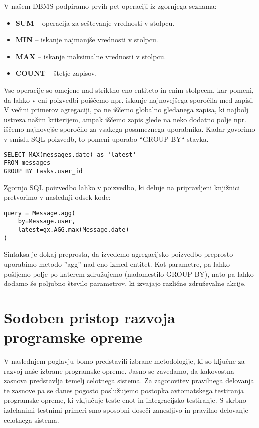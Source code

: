 \documentclass[a4paper,12pt,openright]{book}
\begin{document}
\begin{itemize}
        V našem DBMS podpiramo prvih pet operaciji iz zgornjega seznama:
        \begin{itemize}
            \item \textbf{SUM} – operacija za seštevanje vrednosti v stolpcu.
            \item \textbf{MIN} – iskanje najmanjše vrednosti v stolpcu.
            \item \textbf{MAX} – iskanje maksimalne vrednosti v stolpcu.
            \item \textbf{COUNT} – štetje zapisov.
        \end{itemize}

        Vse operacije so omejene nad striktno eno entiteto in enim stolpcem, kar pomeni, da lahko v eni poizvedbi poiščemo npr. iskanje najnovejšega sporočila med zapisi. V večini primerov agregaciji, pa ne iščemo globalno gledanega zapisa, ki najbolj ustreza našim kriterijem, ampak iščemo zapis glede na neko dodatno polje npr. iščemo najnovejše sporočilo za vsakega posameznega uporabnika. Kadar govorimo v smislu SQL poizvedb, to pomeni uporabo ``GROUP BY`` stavka.

\begin{verbatim}
SELECT MAX(messages.date) as 'latest' 
FROM messages
GROUP BY tasks.user_id
\end{verbatim}

        \noindent
        Zgornjo SQL poizvedbo lahko v poizvedbo, ki deluje na pripravljeni knjižnici pretvorimo v naslednji odsek kode:

\begin{verbatim}
query = Message.agg(
    by=Message.user, 
    latest=gx.AGG.max(Message.date)
)
\end{verbatim}

        \noindent
        Sintaksa je dokaj preprosta, da izvedemo agregacijsko poizvedbo preprosto uporabimo metodo ''agg'' nad eno izmed entitet. Kot parametre, pa lahko pošljemo polje po katerem združujemo (nadomestilo GROUP BY), nato pa lahko dodamo še poljubno število parametrov, ki izvajajo različne združevalne akcije.
\end{itemize}

\chapter{Sodoben pristop razvoja programske opreme}
\label{ch1}

    V naslednjem poglavju bomo predstavili izbrane metodologije, ki so ključne za razvoj naše izbrane programske opreme. Jasno se zavedamo, da kakovostna zasnova predstavlja temelj celotnega sistema. Za zagotovitev pravilnega delovanja te zasnove pa se danes pogosto poslužujemo postopka avtomatskega testiranja programske opreme, ki vključuje teste enot in integracijsko testiranje. S skrbno izdelanimi testnimi primeri smo sposobni doseči zanesljivo in pravilno delovanje celotnega sistema.
\end{document}
